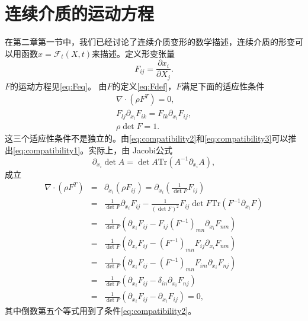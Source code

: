 \section{连续介质的运动方程}
在第二章第一节中，我们已经讨论了连续介质变形的数学描述，连续介质的形变可以用函数$x=\mathcal{F}_t (X,t)$来描述。定义形变张量
\begin{equation}\label{eq:Fdef}
	F_{ij} = \frac{\partial x_i}{\partial X_j}.
\end{equation}
$F$的运动方程见\eqref{eq:Feq}。
由$F$的定义\eqref{eq:Fdef}，$F$满足下面的适应性条件\cite{dimitrienko2010nonlinear}
\begin{subequations}
\begin{align}
\nabla \cdot (\rho F^T) = 0,\label{eq:compatibility1} \\
 F_{lj} \partial_{x_l} F_{ik} = F_{lk} \partial_{x_l} F_{ij} , \label{eq:compatibility2} \\
 \rho \det F = 1. \label{eq:compatibility3} 
\end{align}
\end{subequations}
这三个适应性条件不是独立的。由\eqref{eq:compatibility2}和\eqref{eq:compatibility3}可以推出\eqref{eq:compatibility1}。实际上，由
Jacobi公式
$$
\partial_{x_i}\det A = \det A \mbox{Tr}(A^{-1} \partial_{x_i} A),
$$
成立
\begin{eqnarray*}
\nabla \cdot (\rho F^T)  & = &\partial_{x_i} ( \rho F_{ij}) = \partial_{x_i} ( \frac{1}{\det F} F_{ij})  \\
&=& \frac{1}{\det F} \partial_{x_i} F_{ij}  - \frac{1}{(\det F)^2} F_{ij} \det F \mbox{Tr}(F^{-1} \partial_{x_i} F) \\
&=&\frac{1}{\det F} (\partial_{x_i} F_{ij} - F_{ij} (F^{-1})_{mn} \partial_{x_i} F_{nm}) \\
&=& \frac{1}{\det F} (\partial_{x_i} F_{ij} - (F^{-1})_{mn} F_{ij} \partial_{x_i} F_{nm}) \\
&=&  \frac{1}{\det F} (\partial_{x_i} F_{ij} - (F^{-1})_{mn} F_{im} \partial_{x_i} F_{nj}) \\
&=&  \frac{1}{\det F} (\partial_{x_i} F_{ij} - \delta_{in} \partial_{x_i} F_{nj}) \\
&=&  \frac{1}{\det F} (\partial_{x_i} F_{ij} - \partial_{x_i} F_{ij}) =0 ,
\end{eqnarray*}
其中倒数第五个等式用到了条件\eqref{eq:compatibility2}。

